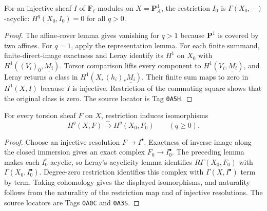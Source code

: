 \begin{lemma}
\label{lemma:weil-pbc-p1-injective-acyclic}
\uses{}

For an injective sheaf $I$ of $\mathbf F_\ell$-modules on
$X=\mathbf P^1_A$, the restriction
$I_0$ is $\Gamma(X_0,-)$-acyclic: $H^q(X_0,I_0)=0$ for all $q>0$.
\end{lemma}
\begin{proof}

The affine-cover lemma gives vanishing for $q>1$ because $\mathbf P^1$ is
covered by two affines.  For $q=1$, apply the representation lemma.  For each
finite summand, finite-direct-image exactness and Leray identify its $H^1$ on
$X_0$ with $H^1((V_i)_0,\underline{M_i})$.  Torsor comparison lifts every
component to $H^1(V_i,\underline{M_i})$, and Leray returns a class in
$H^1(X,(h_i)_*\underline{M_i})$.  Their finite sum maps to zero in $H^1(X,I)$
because $I$ is injective.  Restriction of the commuting square shows that the
original class is zero.  The source locator is Tag \texttt{0A5H}.
\end{proof}

\begin{proposition}
\label{prop:weil-pbc-p1-strict-henselian-comparison}
For every torsion sheaf $F$ on $X$, restriction induces isomorphisms
\[
 H^q(X,F)\xrightarrow{\sim}H^q(X_0,F_0)\qquad(q\geq0).
\]
\end{proposition}
\begin{proof}

Choose an injective resolution $F\to I^\bullet$.  Exactness of inverse
image along the closed immersion gives an exact complex $F_0\to I_0^\bullet$.
The preceding lemma makes each $I_0^r$ acyclic, so Leray's acyclicity lemma
identifies $R\Gamma(X_0,F_0)$ with $\Gamma(X_0,I_0^\bullet)$.  Degree-zero
restriction identifies this complex with $\Gamma(X,I^\bullet)$ term by term.
Taking cohomology gives the displayed isomorphisms, and naturality follows
from the naturality of the restriction map and of injective resolutions.  The
source locators are Tags \texttt{0A0C} and \texttt{0A3S}.
\end{proof}


